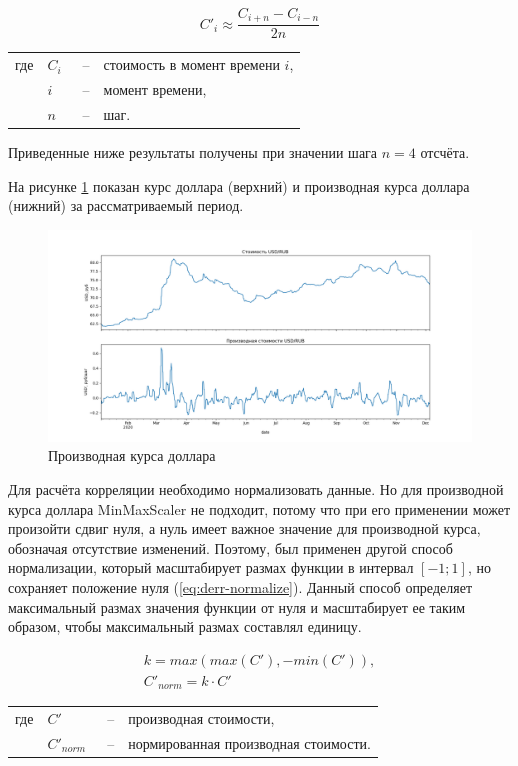 \begin{equation}
    C'_i \approx \frac{C_{i+n} - C_{i-n}}{2n}
    \label{eq:derrivative}
\end{equation}
\noindent\begin{tabularx}{\linewidth}{lllX}
    где & $C_i$    &~--& стоимость в момент времени $i$, \\
        & $i$      &~--& момент времени, \\
        & $n$      &~--& шаг. \\
\end{tabularx}

Приведенные ниже результаты получены при значении шага $n = 4$ отсчёта.

На рисунке \ref{img:usd_derrivative} показан курс доллара (верхний) и производная курса доллара (нижний) за рассматриваемый период.

\begin{figure}[h]
    \centering
    \includegraphics[width=\linewidth]{images/correlations/usd_derrivative.png}
    \caption{Производная курса доллара}
    \label{img:usd_derrivative}
\end{figure}

Для расчёта корреляции необходимо нормализовать данные. Но для производной курса доллара MinMaxScaler не подходит, потому что при его применении может произойти сдвиг нуля, а нуль имеет важное значение для производной курса, обозначая отсутствие изменений. Поэтому, был применен другой способ нормализации, который масштабирует размах функции в интервал $[-1; 1]$, но сохраняет положение нуля (\ref{eq:derr-normalize}). Данный способ определяет максимальный размах значения функции от нуля и масштабирует ее таким образом, чтобы максимальный размах составлял единицу.

\begin{equation}
    \begin{array}{l}
        k = max(max(C'), -min(C')), \\
        C'_{norm} = k \cdot C'
    \end{array}
    \label{eq:derr-normalize}
\end{equation}\noindent\begin{tabularx}{\linewidth}{lllX}
    где & $C'$         &~--& производная стоимости, \\
        & $C'_{norm}$  &~--& нормированная производная стоимости. \\
\end{tabularx}


